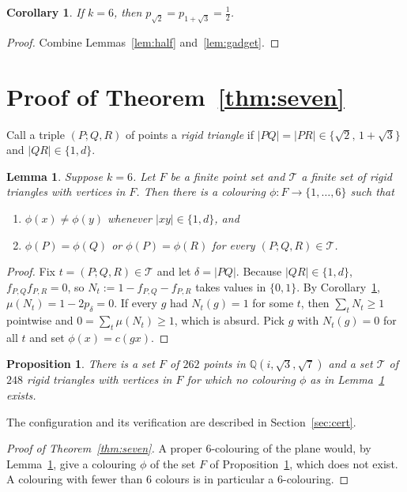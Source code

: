 \documentclass[11pt,a4paper]{amsart}
\newtheorem{lemma}[theorem]{Lemma}
\newtheorem{proposition}[theorem]{Proposition}
\newtheorem{corollary}[theorem]{Corollary}
\theoremstyle{remark}
\newcommand{\Q}{\mathbb{Q}}
\begin{document}
\begin{corollary}\label{cor:equal}
If $k=6$, then $p_{\sqrt2}=p_{1+\sqrt3}=\tfrac12$.
\end{corollary}

\begin{proof}
Combine Lemmas~\ref{lem:half} and~\ref{lem:gadget}.
\end{proof}

\section{Proof of Theorem~\ref{thm:seven}}

Call a triple $(P;Q,R)$ of points a \emph{rigid triangle} if $|PQ|=|PR|\in\{\sqrt2,\,1+\sqrt3\}$ and $|QR|\in\{1,d\}$.

\begin{lemma}\label{lem:finite}
Suppose $k=6$. Let $F$ be a finite point set and $\mathcal T$ a finite set of rigid triangles with vertices in $F$. Then there is a colouring $\phi\colon F\to\{1,\dots,6\}$ such that
\begin{enumerate}
\item $\phi(x)\ne\phi(y)$ whenever $|xy|\in\{1,d\}$, and
\item $\phi(P)=\phi(Q)$ or $\phi(P)=\phi(R)$ for every $(P;Q,R)\in\mathcal T$.
\end{enumerate}
\end{lemma}

\begin{proof}
Fix $t=(P;Q,R)\in\mathcal T$ and let $\delta=|PQ|$. Because $|QR|\in\{1,d\}$, $f_{P,Q}f_{P,R}=0$, so $N_t:=1-f_{P,Q}-f_{P,R}$ takes values in $\{0,1\}$. By Corollary~\ref{cor:equal}, $\mu(N_t)=1-2p_\delta=0$. If every $g$ had $N_t(g)=1$ for some $t$, then $\sum_t N_t\ge1$ pointwise and $0=\sum_t\mu(N_t)\ge1$, which is absurd. Pick $g$ with $N_t(g)=0$ for all $t$ and set $\phi(x)=c(gx)$.
\end{proof}

\begin{proposition}\label{prop:cert}
There is a set $F$ of $262$ points in $\Q(i,\sqrt3,\sqrt7)$ and a set $\mathcal T$ of $248$ rigid triangles with vertices in $F$ for which no colouring $\phi$ as in Lemma~\ref{lem:finite} exists.
\end{proposition}

The configuration and its verification are described in Section~\ref{sec:cert}.

\begin{proof}[Proof of Theorem~\ref{thm:seven}]
A proper $6$-colouring of the plane would, by Lemma~\ref{lem:finite}, give a colouring $\phi$ of the set $F$ of Proposition~\ref{prop:cert}, which does not exist. A colouring with fewer than $6$ colours is in particular a $6$-colouring.
\end{proof}
\end{document}
